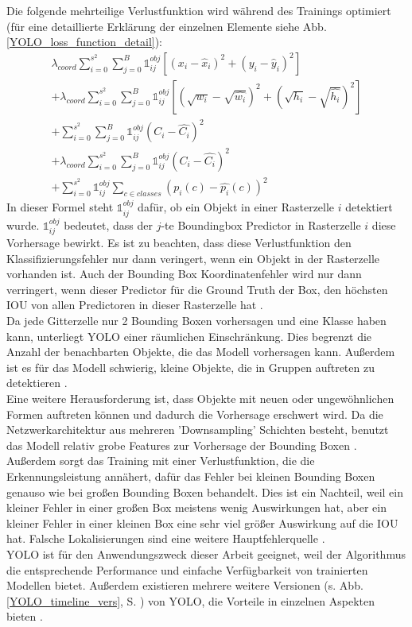 {{	Die folgende mehrteilige Verlustfunktion wird während des Trainings optimiert (für eine detaillierte Erklärung der einzelnen Elemente siehe Abb. \ref{YOLO_loss_function_detail}):
	\begin{multline}
		\lambda_{coord} \sum_{i=0}^{s^2} \sum_{j=0}^{B} \mathbb{1}_{i j}^{obj}\left[(x_i-\hat{x}_i)^2 + (y_i - \hat{y}_i)^2\right]\\
		+ \lambda_{coord} \sum_{i=0}^{s^2} \sum_{j=0}^{B} \mathbb{1}_{i j}^{obj}\left[\left(\sqrt{w_i} - \sqrt{\hat{w_i}}\right)^2 + \left(\sqrt{h_i}-\sqrt{\hat{h_i}}\right)^2\right]\\
		+ \sum_{i=0}^{s^2} \sum_{j=0}^{B} \mathbb{1}_{i j}^{obj}\left(C_i - \hat{C_i}\right)^2\\
		+ \lambda_{coord} \sum_{i=0}^{s^2} \sum_{j=0}^{B} \mathbb{1}_{i j}^{obj}\left(C_i - \hat{C_i}\right)^2\\
		+ \sum_{i=0}^{s^2} \mathbb{1}_{i j}^{obj} \sum_{c \in classes } \left(p_i(c)-\hat{p_i}(c)\right)^2
	\end{multline} 
	 In dieser Formel steht $\mathbb{1}_{i j}^{obj}$ dafür, ob ein Objekt in einer Rasterzelle $i$ detektiert wurde. $\mathbb{1}_{i j}^{obj}$ bedeutet, dass der $j$-te Boundingbox Predictor in Rasterzelle $i$ diese Vorhersage bewirkt. Es ist zu beachten, dass diese Verlustfunktion den Klassifizierungsfehler nur dann veringert, wenn ein Objekt in der Rasterzelle vorhanden ist. Auch der Bounding Box Koordinatenfehler wird nur dann verringert, wenn dieser Predictor für die Ground Truth der Box, den höchsten IOU von allen Predictoren in dieser Rasterzelle hat \citep{Redmon2016}. \\
	Da jede Gitterzelle nur 2 Bounding Boxen vorhersagen und eine Klasse haben kann, unterliegt YOLO einer räumlichen Einschränkung. Dies begrenzt die Anzahl der benachbarten Objekte, die das Modell vorhersagen kann. Außerdem ist es für das Modell schwierig, kleine Objekte, die in Gruppen auftreten zu detektieren \citep{Redmon2016}. \\
	Eine weitere Herausforderung ist, dass Objekte mit neuen oder ungewöhnlichen Formen auftreten können und dadurch die Vorhersage erschwert wird. Da die Netzwerkarchitektur aus mehreren 'Downsampling' Schichten besteht, benutzt das Modell relativ grobe Features zur Vorhersage der Bounding Boxen \citep{Redmon2016}. \\
	Außerdem sorgt das Training mit einer Verlustfunktion, die die Erkennungsleistung annähert, dafür das Fehler bei kleinen Bounding Boxen genauso wie bei großen Bounding Boxen behandelt. Dies ist ein Nachteil, weil ein kleiner Fehler in einer großen Box meistens wenig Auswirkungen hat, aber ein kleiner Fehler in einer kleinen Box eine sehr viel größer Auswirkung auf die IOU hat. Falsche Lokalisierungen sind eine weitere Hauptfehlerquelle \citep{Redmon2016}. \\
	YOLO ist für den Anwendungszweck dieser Arbeit geeignet, weil der Algorithmus die entsprechende Performance und einfache Verfügbarkeit von trainierten Modellen bietet. Außerdem existieren mehrere weitere Versionen (s. Abb. \ref{YOLO_timeline_vers}, S. \pageref{YOLO_timeline_vers}) von YOLO, die Vorteile in einzelnen Aspekten bieten \citep{Terven2023}. \\

}}
